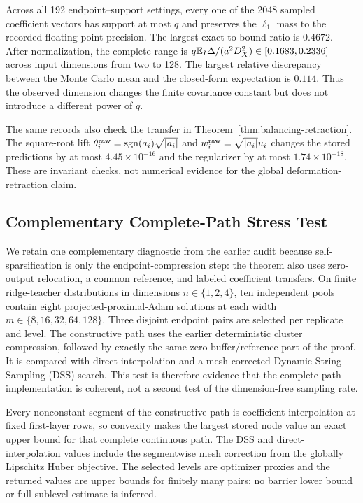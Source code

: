 Across all 192 endpoint--support settings, every one of the 2048 sampled
coefficient vectors has support at most $q$ and preserves the $\ell_1$ mass
to the recorded floating-point precision.  The largest exact-to-bound ratio
is $0.4672$.  After normalization, the complete range is
$q\mathbb{E}_I\Delta/(a^2D_X^2)\in[0.1683,0.2336]$ across input dimensions from two to
128.  The largest relative discrepancy between the Monte Carlo mean and the
closed-form expectation is $0.114$.  Thus the observed dimension changes the
finite covariance constant but does not introduce a different power of $q$.



The same records also check the transfer in
Theorem~\ref{thm:balancing-retraction}.  The square-root lift
$\theta_i^{\rm raw}=\operatorname{sgn}(a_i)\sqrt{\left\lvert a_i \right\rvert}$ and
$w_i^{\rm raw}=\sqrt{\left\lvert a_i \right\rvert}u_i$ changes the stored predictions by at most
$4.45\times10^{-16}$ and the regularizer by at most
$1.74\times10^{-18}$.  These are invariant checks, not numerical evidence for
the global deformation-retraction claim.

\subsection{Complementary Complete-Path Stress Test}

We retain one complementary diagnostic from the earlier audit because
self-sparsification is only the endpoint-compression step: the theorem also
uses zero-output relocation, a common reference, and labeled coefficient
transfers.  On finite ridge-teacher distributions in dimensions
$n\in\{1,2,4\}$, ten independent pools contain eight projected-proximal-Adam
solutions at each width $m\in\{8,16,32,64,128\}$.  Three disjoint endpoint
pairs are selected per replicate and level.  The constructive path uses the
earlier deterministic cluster compression, followed by exactly the same
zero-buffer/reference part of the proof.  It is compared with direct
interpolation and a mesh-corrected Dynamic String Sampling (DSS) search.  This
test is therefore evidence that the complete path implementation is coherent,
not a second test of the dimension-free sampling rate.

Every nonconstant segment of the constructive path is coefficient
interpolation at fixed first-layer rows, so convexity makes the largest stored
node value an exact upper bound for that complete continuous path.  The DSS
and direct-interpolation values include the segmentwise mesh correction from
the globally Lipschitz Huber objective.  The selected levels are optimizer
proxies and the returned values are upper bounds for finitely many pairs; no
barrier lower bound or full-sublevel estimate is inferred.


